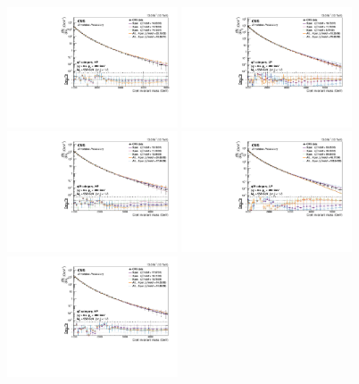 \begin{figure}[h!]
\centering
\includegraphics[width=0.45\textwidth]{figures/analysis/search2/AN-16-235/plots/qVHP_fitComp.pdf}
\includegraphics[width=0.45\textwidth]{figures/analysis/search2/AN-16-235/plots/qVLP_fitComp.pdf}\\
\includegraphics[width=0.45\textwidth]{figures/analysis/search2/AN-16-235/plots/qWHP_fitComp.pdf}
\includegraphics[width=0.45\textwidth]{figures/analysis/search2/AN-16-235/plots/qWLP_fitComp.pdf}\\
\includegraphics[width=0.45\textwidth]{figures/analysis/search2/AN-16-235/plots/qZHP_fitComp.pdf}

\end{figure}
